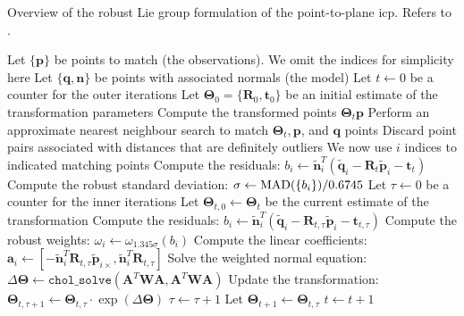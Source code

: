 \begin{algorithm}
\caption{Overview of the robust Lie group formulation of the point-to-plane \gls{icp}. Refers to .}\label{c1:alg:liep2plan}
\begin{algorithmic}
\State Let $\{\mathbf{p}\}$ be points to match (the observations). We omit the indices for simplicity here
\State Let $\{\mathbf{q},\mathbf{n}\}$ be points with associated normals (the model)
\State Let $t \gets 0$ be a counter for the outer iterations
\State Let $\mathbf{\Theta}_0 = \{\mathbf{R}_0,\mathbf{t}_0\}$ be an initial estimate of the transformation parameters
  \State Compute the transformed points $\mathbf{\Theta}_t \mathbf{p}$
  \State Perform an approximate nearest neighbour search to match $\mathbf{\Theta}_t, \mathbf{p}$, and $\mathbf{q}$ points
  \State Discard point pairs associated with distances that are definitely outliers
  \State We now use $i$ indices to indicated matching points
  \State Compute the residuals: $b_i \gets \tilde{\mathbf{n}}_i^T (\tilde{\mathbf{q}}_i - \mathbf{R}_t \tilde{\mathbf{p}}_i - \mathbf{t}_t)$
  \State {}
  \State Compute the robust standard deviation: $\sigma \gets \operatorname{MAD}(\{b_i\})/0.6745$
  \State {}
  \State Let $\tau \gets 0$ be a counter for the inner iterations
  \State Let $\mathbf{\Theta}_{t,0} \gets \mathbf{\Theta}_{t}$ be the current estimate of the transformation
      \State Compute the residuals: $b_i \gets \tilde{\mathbf{n}}_i^T (\tilde{\mathbf{q}}_i - \mathbf{R}_{t,\tau} \tilde{\mathbf{p}}_i - \mathbf{t}_{t,\tau})$
    \EndIf
    \State Compute the robust weights: $\omega_i \gets \omega_{1.345\sigma}(b_i)$
    \State Compute the linear coefficients: $\mathbf{a}_i \gets [-\tilde{\mathbf{n}}_i^T \mathbf{R}_{t,\tau} {{\tilde{\mathbf{p}}}_{i\times}}, \tilde{\mathbf{n}}_i^T \mathbf{R}_{t,\tau}]$
    \State Solve the weighted normal equation:
    \State \quad $\Delta\mathbf{\Theta} \gets \texttt{chol\_solve}(\mathbf{A}^T \mathbf{W} \mathbf{A}, \mathbf{A}^T \mathbf{W} \mathbf{A})$
    \State Update the transformation: $\mathbf{\Theta}_{t,\tau+1} \gets \mathbf{\Theta}_{t,\tau} \cdot \exp(\Delta\mathbf{\Theta})$
    \State $\tau \gets \tau+1$
  \EndWhile
  \State Let $\mathbf{\Theta}_{t+1} \gets \mathbf{\Theta}_{t,\tau}$
  \State $t \gets t+1$
\EndWhile
\end{algorithmic}
\end{algorithm}